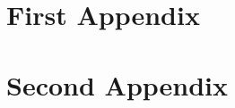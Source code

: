\documentclass{hasel_thesis}
\begin{document}
% 



\appendix
\chapter{First Appendix}
\chapter{Second Appendix}

\backmatter


\end{document}
